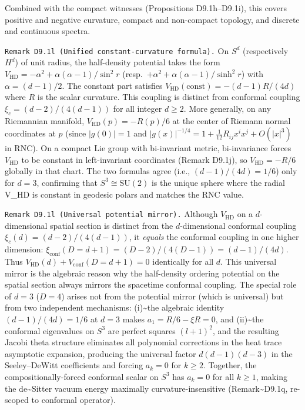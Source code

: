 \documentclass[
]{article}
\begin{document}
Combined with the compact witnesses (Propositions D9.1h--D9.1i), this
covers positive and negative curvature, compact and non-compact
topology, and discrete and continuous spectra.

\texttt{Remark\ D9.1l\ (Unified\ constant-curvature\ formula).} On
\(S^d\) (respectively \(H^d\)) of unit radius, the half-density
potential takes the form
\(V_{\mathrm{HD}}=-\alpha^2+\alpha(\alpha{-}1)/\sin^2 r\)
(resp.~\(+\alpha^2+\alpha(\alpha{-}1)/\sinh^2 r\)) with
\(\alpha=(d{-}1)/2\). The constant part satisfies
\(V_{\mathrm{HD}}(\mathrm{const})=-(d{-}1)R/(4d)\) where \(R\) is the
scalar curvature. This coupling is distinct from conformal coupling
\(\xi_c=(d{-}2)/(4(d{-}1))\) for all integer \(d\ge2\). More generally,
on any Riemannian manifold, \(V_{\mathrm{HD}}(p)=-R(p)/6\) at the center
of Riemann normal coordinates at \(p\) (since \(|g(0)|=1\) and
\(|g(x)|^{-1/4}=1+\frac{1}{12}R_{ij}x^ix^j+O(|x|^3)\) in RNC). On a
compact Lie group with bi-invariant metric, bi-invariance forces
\(V_{\mathrm{HD}}\) to be constant in left-invariant coordinates (Remark
D9.1j), so \(V_{\mathrm{HD}}=-R/6\) globally in that chart. The two
formulas agree (i.e., \((d{-}1)/(4d)=1/6\)) only for \(d=3\), confirming
that \(S^3\cong\mathrm{SU}(2)\) is the unique sphere where the radial
V\_HD is constant in geodesic polars and matches the RNC value.

\texttt{Remark\ D9.1l\textquotesingle{}\ (Universal\ potential\ mirror).}
Although \(V_{\mathrm{HD}}\) on a \(d\)-dimensional spatial section is
distinct from the \(d\)-dimensional conformal coupling
\(\xi_c(d)=(d{-}2)/(4(d{-}1))\), it \emph{equals} the conformal coupling
in one higher dimension:
\(\xi_{\mathrm{conf}}(D{=}d{+}1)=(D{-}2)/(4(D{-}1))=(d{-}1)/(4d)\). Thus
\(V_{\mathrm{HD}}(d)+V_{\mathrm{conf}}(D{=}d{+}1)=0\) identically for
all \(d\). This universal mirror is the algebraic reason why the
half-density ordering potential on the spatial section always mirrors
the spacetime conformal coupling. The special role of \(d=3\) (\(D=4\))
arises not from the potential mirror (which is universal) but from two
independent mechanisms: (i)\textasciitilde the algebraic identity
\((d{-}1)/(4d)=1/6\) at \(d=3\) makes \(a_1=R/6-\xi R=0\), and
(ii)\textasciitilde the conformal eigenvalues on \(S^3\) are perfect
squares \((l{+}1)^2\), and the resulting Jacobi theta structure
eliminates all polynomial corrections in the heat trace asymptotic
expansion, producing the universal factor \(d(d{-}1)(d{-}3)\) in the
Seeley--DeWitt coefficients and forcing \(a_k=0\) for \(k\ge2\).
Together, the compositionally-forced conformal scalar on \(S^3\) has
\(a_k=0\) for all \(k\ge1\), making the de\textasciitilde Sitter vacuum
energy maximally curvature-insensitive (Remark\textasciitilde D9.1q,
re-scoped to conformal operator).
\end{document}
